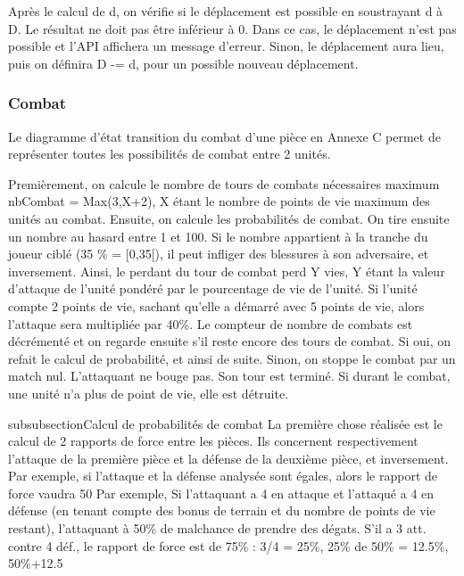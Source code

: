 Après le calcul de d, on vérifie si le déplacement est possible en soustrayant d à D. Le résultat ne doit pas être inférieur à 0. Dans ce cas, le déplacement n'est pas possible et l'API affichera un message d'erreur. Sinon, le déplacement aura lieu, puis on définira D -= d, pour un possible nouveau déplacement.

\subsubsection{Combat}
Le diagramme d'état transition du combat d'une pièce en Annexe C permet de représenter toutes les possibilités de combat entre 2 unités. 

Premièrement, on calcule le nombre de tours de combats nécessaires maximum \smallbreak 
nbCombat = Max(3,X+2), X étant le nombre de points de vie maximum des unités au combat. Ensuite, on calcule les probabilités de combat. On tire ensuite un nombre au hasard entre 1 et 100. Si le nombre appartient à la tranche du joueur ciblé (35 \% = [0,35[), il peut infliger des blessures à son adversaire, et inversement. Ainsi, le perdant du tour de combat perd Y vies, Y étant la valeur d'attaque de l'unité pondéré par le pourcentage de vie de l'unité. Si l'unité compte 2 points de vie, sachant qu'elle a démarré avec 5 points de vie, alors l'attaque sera multipliée par 40\%. Le compteur de nombre de combats est décrémenté et on regarde ensuite s'il reste encore des tours de combat. Si oui, on refait le calcul de probabilité, et ainsi de suite. Sinon, on stoppe le combat par un match nul. L'attaquant ne bouge pas. Son tour est terminé. Si durant le combat, une unité n'a plus de point de vie, elle est détruite.

subsubsection{Calcul de probabilités de combat}
La première chose réalisée est le calcul de 2 rapports de force entre les pièces. Ils concernent respectivement l'attaque de la première pièce et la défense de la deuxième pièce, et inversement. Par exemple, si l'attaque et la défense analysée sont égales, alors le rapport de force vaudra 50%
Par exemple, Si l’attaquant a 4 en attaque et l’attaqué a 4 en défense
(en tenant compte des bonus de terrain et du nombre de points de vie restant), l’attaquant à 50\%
de malchance de prendre des dégats. S’il a 3 att. contre 4 déf., le rapport de force est de 75\% : 3/4
= 25\%, 25\% de 50\% = 12.5\%, 50\%+12.5%

